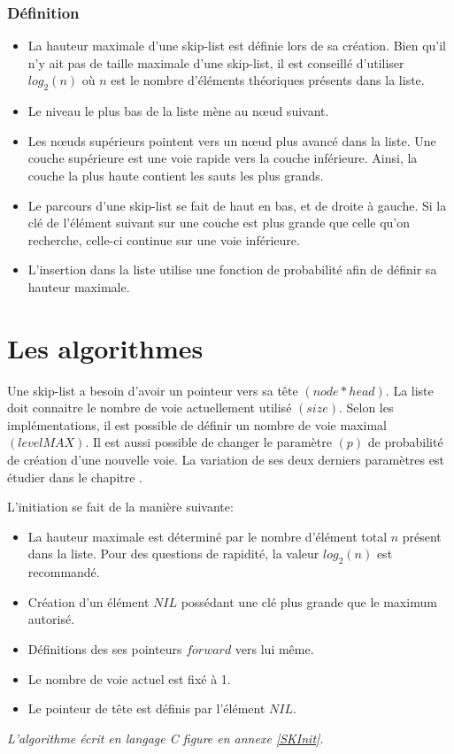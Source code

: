 \documentclass[hidelinks,a4paper, 12pt]{article}
\begin{document}
	\subsubsection*{Définition}
	\begin{itemize}
		\item La hauteur maximale d'une skip-list est définie lors de sa création. Bien qu'il n'y ait pas de taille maximale d'une skip-list, il est conseillé d'utiliser $log_2(n)$ où $n$ est le nombre d'éléments théoriques présents dans la liste. 
		\item Le niveau le plus bas de la liste mène au nœud suivant. 
		\item Les nœuds supérieurs pointent vers un nœud plus avancé dans la liste.  Une couche supérieure est une voie rapide vers la couche inférieure. Ainsi, la couche la plus haute contient les sauts les plus grands.
		\item Le parcours d'une skip-list se fait de haut en bas, et de droite à gauche. Si la clé de l'élément suivant sur une couche est plus grande que celle qu'on recherche, celle-ci continue sur une voie inférieure.
		\item L'insertion dans la liste utilise une fonction de probabilité afin de définir sa hauteur maximale.
	\end{itemize}
	
	\newpage
	\section{Les algorithmes}
	Une skip-list a besoin d'avoir un pointeur vers sa tête $(node* head)$. La liste doit connaitre le nombre de voie actuellement utilisé $(size)$. Selon les implémentations, il est possible de définir un nombre de voie maximal $(levelMAX)$. Il est aussi possible de changer le paramètre $(p)$ de probabilité de création d'une nouvelle voie. La variation de ses deux derniers paramètres est étudier dans le chapitre .
	
	
	L'initiation se fait de la manière suivante:
	\begin{itemize}
		\item La hauteur maximale est déterminé par le nombre d'élément total $n$ présent dans la liste. Pour des questions de rapidité, la valeur $log_2(n)$ est recommandé.
		\item Création d'un élément $NIL$ possédant une clé plus grande que le maximum autorisé.
		\item Définitions des ses pointeurs $forward$ vers lui même.
		\item Le nombre de voie actuel est fixé à 1.
		\item Le pointeur de tête est définis par l'élément $NIL$.
	\end{itemize}
	\emph{L'algorithme écrit en langage C figure en annexe \ref{SKInit}.}
\end{document}
